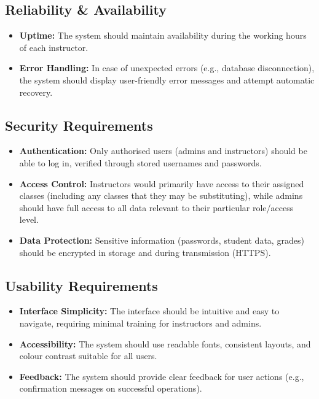 \subsection{Reliability \& Availability}
\begin{itemize}
    \item \textbf{Uptime:} The system should maintain availability during the working hours of each instructor.
    \item \textbf{Error Handling:} In case of unexpected errors (e.g., database disconnection), the system should display user-friendly error messages and attempt automatic recovery.
\end{itemize}

\subsection{Security Requirements}
\begin{itemize}
    \item \textbf{Authentication:} Only authorised users (admins and instructors) should be able to log in, verified through stored usernames and passwords.
    \item \textbf{Access Control:} Instructors would primarily have access to their assigned classes (including any classes that they may be substituting), while admins should have full access to all data relevant to their particular role/access level.
    \item \textbf{Data Protection:} Sensitive information (passwords, student data, grades) should be encrypted in storage and during transmission (HTTPS).
\end{itemize}

\subsection{Usability Requirements}
\begin{itemize}
    \item \textbf{Interface Simplicity:} The interface should be intuitive and easy to navigate, requiring minimal training for instructors and admins.
    \item \textbf{Accessibility:} The system should use readable fonts, consistent layouts, and colour contrast suitable for all users.
    \item \textbf{Feedback:} The system should provide clear feedback for user actions (e.g., confirmation messages on successful operations).
\end{itemize}

